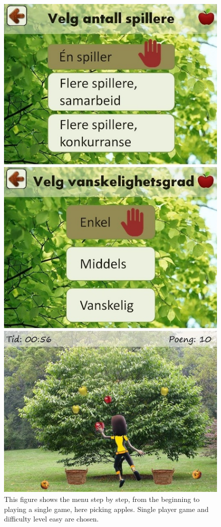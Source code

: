 \begin{figure} [ht!]
\centering
\includegraphics[scale=0.5]{menuStep2.jpg}
\caption[The menu, part two]{This figure shows the menu step by step, from the beginning to playing a single game, here picking apples. Single player game and difficulty level easy are chosen.}
\label{menu2}
\end{figure}

